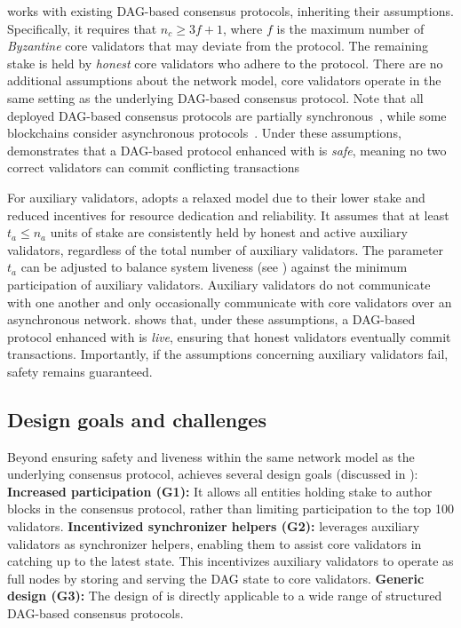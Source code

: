 \sysname works with existing DAG-based consensus protocols, inheriting their assumptions. Specifically, it requires that $n_c \geq 3f + 1$, where $f$ is the maximum number of \emph{Byzantine} core validators that may deviate from the protocol. The remaining stake is held by \emph{honest} core validators who adhere to the protocol. There are no additional assumptions about the network model, core validators operate in the same setting as the underlying DAG-based consensus protocol. Note that all deployed DAG-based consensus protocols are partially synchronous~\cite{dwork1988consensus}, while some blockchains consider asynchronous protocols~\cite{sui-code}. Under these assumptions,  demonstrates that a DAG-based protocol enhanced with \sysname is \emph{safe}, meaning no two correct validators can commit conflicting transactions

For auxiliary validators, \sysname adopts a relaxed model due to their lower stake and reduced incentives for resource dedication and reliability. It assumes that at least $t_a \leq n_a$ units of stake are consistently held by honest and active auxiliary validators, regardless of the total number of auxiliary validators. The parameter $t_a$ can be adjusted to balance system liveness (see ) against the minimum participation of auxiliary validators. Auxiliary validators do not communicate with one another and only occasionally communicate with core validators over an asynchronous network.  shows that, under these assumptions, a DAG-based protocol enhanced with \sysname is \emph{live}, ensuring that honest validators eventually commit transactions. Importantly, if the assumptions concerning auxiliary validators fail, safety remains guaranteed.

\subsection{Design goals and challenges} \label{sec:goals}

Beyond ensuring safety and liveness within the same network model as the underlying consensus protocol, \sysname achieves several design goals (discussed in ):
\textbf{Increased participation (G1):} It allows all entities holding stake to author blocks in the consensus protocol, rather than limiting participation to the top 100 validators.
\textbf{Incentivized synchronizer helpers (G2):} \sysname leverages auxiliary validators as synchronizer helpers, enabling them to assist core validators in catching up to the latest state. This incentivizes auxiliary validators to operate as full nodes by storing and serving the DAG state to core validators.
\textbf{Generic design (G3):} The design of \sysname is directly applicable to a wide range of structured DAG-based consensus protocols.

